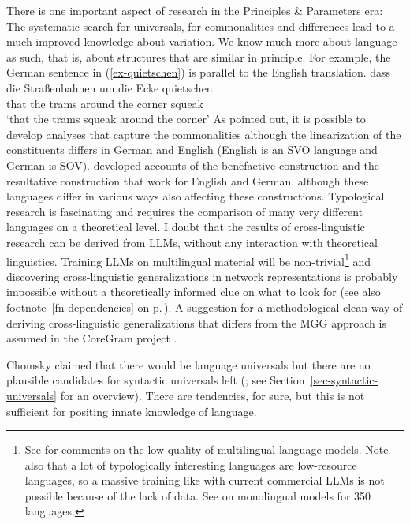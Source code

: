 There is one important aspect of research in the Principles \& Parameters era: The systematic search for
universals, for commonalities and differences lead to a much improved knowledge about variation. We
know much more about language as such, that is, about structures that are similar in principle.
For example, the German sentence in (\ref{ex-quietschen}) is parallel to the English translation. 
\ea
\label{ex-quietschen} 
\gll dass die Straßenbahnen um die Ecke quietschen\\
     that the trams         around the corner squeak\\
\glt `that the trams squeak around the corner'
\z
As \citet{MuellerUnifying} pointed out, it is possible to develop analyses that capture the
commonalities although the linearization of the constituents differs in German and English (English
is an SVO language and German is SOV). \citet{MuellerLFGphrasal} developed accounts of the
benefactive construction and the resultative construction that work for English and German, although
these languages differ in various ways also affecting these constructions.
Typological research is fascinating and requires the comparison of many very different languages on a
theoretical level. I doubt that the results of cross-linguistic research can be derived from LLMs,
without any interaction with theoretical linguistics. Training LLMs on multilingual material will be
non-trivial\footnote{
  See \citet{ChangArnettTu2024a} for comments on the low quality of multilingual language
  models. Note also that a lot of typologically interesting languages are low-resource languages, so
  a massive training like with current commercial LLMs is not possible because of the lack of data. See
  \citet{ChangArnettTu2024a} on monolingual models for 350 languages.
} and discovering cross-linguistic generalizations in network representations is probably
impossible without a theoretically informed clue on what to look for (see also
footnote~\ref{fn-dependencies} on p.\,\pageref{fn-dependencies}). A suggestion for a
methodological clean way of deriving cross-linguistic generalizations that differs from the MGG
approach is assumed in the CoreGram project \citep{MuellerCoreGram}.

Chomsky claimed that there would be language universals but there are no plausible candidates for
syntactic universals left (\citealt{EL2009a}; see Section~\ref{sec-syntactic-universals} for an overview). There are tendencies, for sure, but this is not sufficient for positing
innate knowledge of language. 


